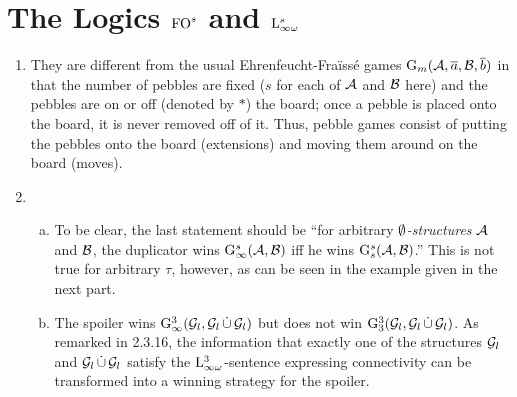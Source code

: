 \section{The Logics $\folog[s]$ and $\inflog[s]{\infty}$}
\begin{enumerate}[1.]
%
\item {} They are different from the usual Ehrenfeucht-Fra\"iss\'e games $\game{m}(\strct{A}, \vect{a}, \strct{B}, \vect{b})$ in that the number of pebbles are fixed ($s$ for each of $\mathcal{A}$ and $\mathcal{B}$ here) and the pebbles are on or off (denoted by $\ast$) the board; once a pebble is placed onto the board, it is never removed off of it. Thus, pebble games consist of putting the pebbles onto the board (extensions) and moving them around on the board (moves).
%
\item {}
\begin{enumerate}[(a)]
\item To be clear, the last statement should be ``for arbitrary \emph{$\emptyset$-structures} $\mathcal{A}$ and $\mathcal{B}$, the duplicator wins $\game[s]{\infty}(\strct{A}, \strct{B})$ iff he wins $\game[s]{s}(\strct{A}, \strct{B})$.'' This is not true for arbitrary $\tau$, however, as can be seen in the example given in the next part.
\item The spoiler wins $\game[3]{\infty}(\strct{G}_l, \strct{G}_l \dunion \strct{G}_l)$ but does not win $\game[3]{3}(\strct{G}_l, \strct{G}_l \dunion \strct{G}_l)$. As remarked in 2.3.16, the information that exactly one of the structures $\mathcal{G}_l$ and $\mathcal{G}_l \mathop{\dot{\cup}} \mathcal{G}_l$ satisfy the $\inflog[3]{\infty}$-sentence expressing connectivity can be transformed into a winning strategy for the spoiler.
\end{enumerate}


\end{enumerate}
